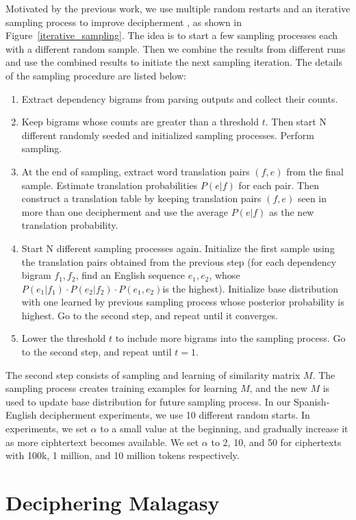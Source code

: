 Motivated by the previous work, we use multiple random restarts and an iterative sampling process to improve decipherment \cite{Dou:2012}, as shown in Figure~\ref{iterative_sampling}. The idea is to start a few sampling processes each with a different random sample. Then we combine the results from different runs and use the combined results to initiate the next sampling iteration. The details of the sampling procedure are listed below:

 \begin{enumerate}
  \item Extract dependency bigrams from parsing outputs and collect their counts.
  \item Keep bigrams whose counts are greater than a threshold $t$. Then start N different randomly seeded and initialized sampling processes. Perform sampling.
  \item At the end of sampling, extract word translation pairs $(f,e)$ from the final sample. Estimate translation probabilities $P(e|f)$  for each pair. Then construct a translation table by keeping translation pairs $(f,e)$ seen in more than one decipherment and use the average $P(e|f)$ as the new translation probability.
  \item Start N different sampling processes again. Initialize the first sample using the translation pairs obtained from the previous step (for each dependency bigram $f_{1},f_{2}$, find an English sequence $e_{1},e_{2}$, whose $P(e_{1}|f_{1})\cdot P(e_{2}|f_{2})\cdot P(e_{1},e_{2})$is the highest). Initialize base distribution with one learned by previous sampling process whose posterior probability is highest. Go to the second step, and repeat until it converges. 
  \item Lower the threshold $t$ to include more bigrams into the sampling process. Go to the second step, and repeat until $t=1$.
 \end{enumerate}

The second step consists of sampling and learning of similarity matrix $M$. The sampling process creates training examples for learning $M$, and the new $M$ is used to update base distribution for future sampling process. In our Spanish-English decipherment experiments, we use 10 different random starts. In experiments, we set $\alpha$ to a small value at the beginning, and gradually increase it  as more ciphtertext becomes available. We set $\alpha$ to 2, 10, and 50 for ciphertexts with 100k, 1 million, and 10 million tokens respectively. 

\section{Deciphering Malagasy}
\label{decipher_malagasy}

